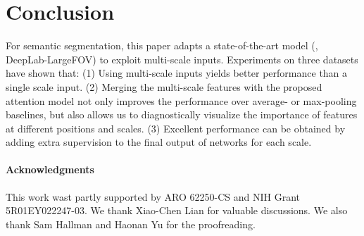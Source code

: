 \section{Conclusion}
For semantic segmentation, this paper adapts a state-of-the-art model (\ie, DeepLab-LargeFOV) to exploit multi-scale inputs. Experiments on three datasets have shown that: (1) Using multi-scale inputs yields better performance than a single scale input. (2) Merging the multi-scale features with the proposed attention model not only improves the performance over average- or max-pooling baselines, but also allows us to diagnostically visualize the importance of features at different positions and scales. (3) Excellent performance can be obtained by adding extra supervision to the final output of networks for each scale. %





\vspace{-10pt}
\paragraph{Acknowledgments} 
This work wast partly supported by ARO 62250-CS and NIH Grant 5R01EY022247-03. We thank Xiao-Chen Lian for valuable discussions. We also thank Sam Hallman and Haonan Yu for the proofreading.
